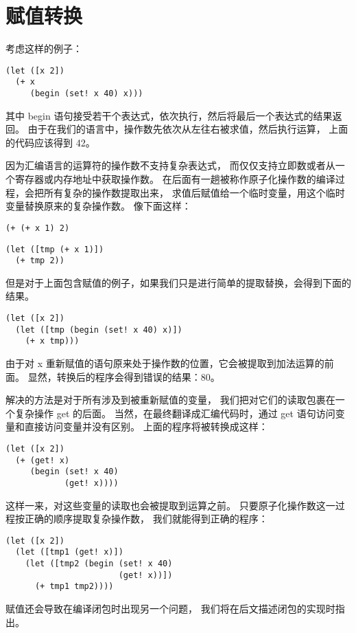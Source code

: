 
\section{赋值转换}

考虑这样的例子：

\begin{lstlisting}
(let ([x 2])
  (+ x
     (begin (set! x 40) x)))
\end{lstlisting}

其中 begin 语句接受若干个表达式，依次执行，然后将最后一个表达式的结果返回。
由于在我们的语言中，操作数先依次从左往右被求值，然后执行运算，
上面的代码应该得到 42。

因为汇编语言的运算符的操作数不支持复杂表达式，
而仅仅支持立即数或者从一个寄存器或内存地址中获取操作数。
在后面有一趟被称作原子化操作数的编译过程，会把所有复杂的操作数提取出来，
求值后赋值给一个临时变量，用这个临时变量替换原来的复杂操作数。
像下面这样：

\begin{transformation}
\begin{lstlisting}
(+ (+ x 1) 2)
\end{lstlisting}
\compilesto
\begin{lstlisting}
(let ([tmp (+ x 1)])
  (+ tmp 2))
\end{lstlisting}
\end{transformation}

但是对于上面包含赋值的例子，如果我们只是进行简单的提取替换，会得到下面的结果。

\begin{lstlisting}
(let ([x 2])
  (let ([tmp (begin (set! x 40) x)])
    (+ x tmp)))
\end{lstlisting}

由于对 x 重新赋值的语句原来处于操作数的位置，它会被提取到加法运算的前面。
显然，转换后的程序会得到错误的结果：80。

解决的方法是对于所有涉及到被重新赋值的变量，
我们把对它们的读取包裹在一个复杂操作 get 的后面。
当然，在最终翻译成汇编代码时，通过 get 语句访问变量和直接访问变量并没有区别。
上面的程序将被转换成这样：

\begin{lstlisting}
(let ([x 2])
  (+ (get! x)
     (begin (set! x 40)
            (get! x))))
\end{lstlisting}

这样一来，对这些变量的读取也会被提取到运算之前。
只要原子化操作数这一过程按正确的顺序提取复杂操作数，
我们就能得到正确的程序：

\begin{lstlisting}
(let ([x 2])
  (let ([tmp1 (get! x)])
    (let ([tmp2 (begin (set! x 40)
                       (get! x))])
      (+ tmp1 tmp2))))
\end{lstlisting}

赋值还会导致在编译闭包时出现另一个问题，
我们将在后文描述闭包的实现时指出。
